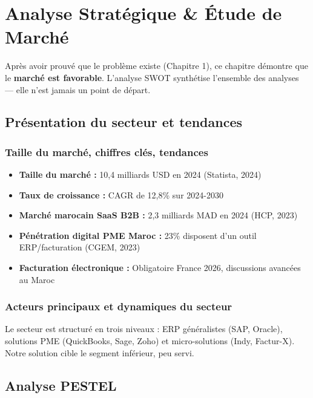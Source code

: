 
\chapter{Analyse Stratégique \& Étude de Marché}

Après avoir prouvé que le problème existe (Chapitre 1), ce chapitre démontre que le \textbf{marché est favorable}. L'analyse SWOT synthétise l'ensemble des analyses — elle n'est jamais un point de départ.

\section{Présentation du secteur et tendances}

\subsection{Taille du marché, chiffres clés, tendances}
\begin{itemize}
    \item \textbf{Taille du marché :} 10,4 milliards USD en 2024 (Statista, 2024)
    \item \textbf{Taux de croissance :} CAGR de 12,8\% sur 2024-2030
    \item \textbf{Marché marocain SaaS B2B :} 2,3 milliards MAD en 2024 (HCP, 2023)
    \item \textbf{Pénétration digital PME Maroc :} 23\% disposent d'un outil ERP/facturation (CGEM, 2023)
    \item \textbf{Facturation électronique :} Obligatoire France 2026, discussions avancées au Maroc
\end{itemize}

\subsection{Acteurs principaux et dynamiques du secteur}

Le secteur est structuré en trois niveaux : ERP généralistes (SAP, Oracle), solutions PME (QuickBooks, Sage, Zoho) et micro-solutions (Indy, Factur-X). Notre solution cible le segment inférieur, peu servi.

\section{Analyse PESTEL}

